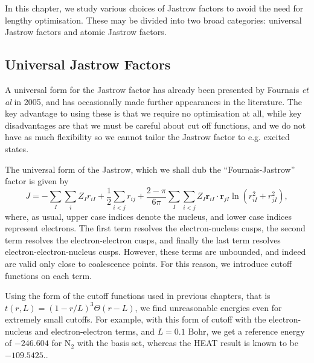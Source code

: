 In this chapter, we study various choices of Jastrow factors to avoid the need for lengthy optimisation. These may be divided into two broad categories: universal Jastrow factors and atomic Jastrow factors.

\subsection{Universal Jastrow Factors}

A universal form for the Jastrow factor has already been presented by Fournais \emph{et al} in 2005,\supercite{fournaisSharp2005} and has occasionally made further appearances in the literature.\supercite{tewSecond2008,szenesStriking2024} The key advantage to using these is that we require no optimisation at all, while key disadvantages are that we must be careful about cut off functions, and we do not have as much flexibility so we cannot tailor the Jastrow factor to e.g. excited states.

The universal form of the Jastrow, which we shall dub the ``Fournais-Jastrow'' factor is given by\supercite{fournaisSharp2005,fournaisNonIsotropic2007}
\begin{equation}
    \label{eq:fournais-full}
    J = -\sum_I\sum_i Z_Ir_{iI} + \frac 12\sum_{i<j}r_{ij} + \frac{2-\pi}{6\pi}\sum_I\sum_{i<j}Z_I\bm r_{iI}\cdot \bm r_{jI}\ln(r_{iI}^2+r_{jI}^2),
\end{equation}
where, as usual, upper case indices denote the nucleus, and lower case indices represent electrons. The first term resolves the electron-nucleus cusps, the second term resolves the electron-electron cusps, and finally the last term resolves electron-electron-nucleus cusps. However, these terms are unbounded, and indeed are valid only close to coalescence points. For this reason, we introduce cutoff functions on each term.

Using the form of the cutoff functions used in previous chapters, that is $t(r,L) = (1-r/L)^3\Theta(r-L)$, we find unreasonable energies even for extremely small cutoffs. For example, with this form of cutoff with the electron-nucleus and electron-electron terms, and $L=0.1$ Bohr, we get a reference energy of $-246.604$ for N$_2$ with the \avtz basis set, whereas the \gls{HEAT} result is known to be $-109.5425$.\supercite{fellerSurvey2008}.

